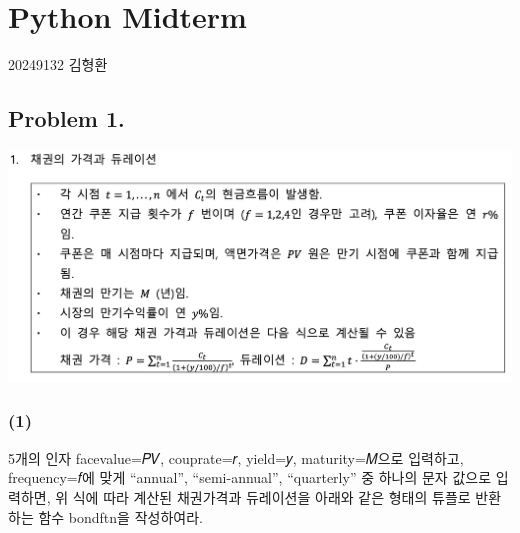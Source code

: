 \documentclass[
  a4paper,
  DIV=11,
  numbers=noendperiod]{scrreprt}
\begin{document}
\chapter*{Python Midterm}\label{python-midterm}


20249132 김형환

\section*{Problem 1.}\label{problem-1.}


\includegraphics{images/Python_midterm1.png}

\subsection*{(1)}\label{section-10}

5개의 인자 facevalue=𝑃𝑉, couprate=𝑟, yield=𝑦, maturity=𝑀으로 입력하고,
frequency=𝑓에 맞게 ``annual'', ``semi-annual'', ``quarterly'' 중 하나의
문자 값으로 입력하면, 위 식에 따라 계산된 채권가격과 듀레이션을 아래와
같은 형태의 튜플로 반환하는 함수 bondftn을 작성하여라.
\end{document}
